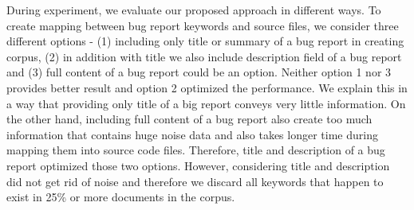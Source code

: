 \documentclass{sig-alternate}
\begin{document}
%
%
%

During experiment, we evaluate our proposed approach in different ways. To create mapping between bug report keywords and source files, we consider three different options - (1) including only title or summary of a bug report in creating corpus, (2) in addition with title we also include description field of a bug report and (3) full content of a bug report could be an option. Neither option 1 nor 3 provides better result and option 2 optimized the performance. We explain this in a way that providing only title of a big report conveys very little information. On the other hand, including full content of a bug report also create too much information that contains huge noise data and also takes longer time during mapping them into source code files. Therefore, title and description of a bug report optimized those two options. However, considering title and description did not get rid of noise and therefore we discard all keywords that happen to exist in 25\% or more documents in the corpus.
\end{document}
